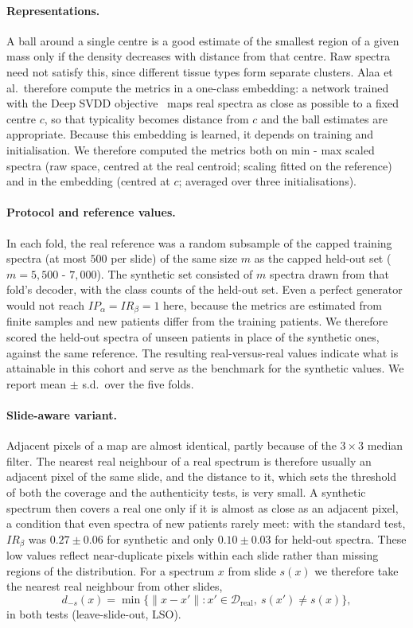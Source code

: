 \documentclass[12pt]{article}
\theoremstyle{paper}
\begin{document}
\paragraph{Representations.}
A ball around a single centre is a good estimate of the smallest region of a given mass only if
the density decreases with distance from that centre. Raw spectra need not satisfy this, since
different tissue types form separate clusters. Alaa et al.\ therefore compute the metrics in a
one-class embedding: a network trained with the Deep SVDD objective~\cite{ruff2018deep} maps real
spectra as close as possible to a fixed centre $c$, so that typicality becomes distance from $c$
and the ball estimates are appropriate. Because this embedding is learned, it depends on training
and initialisation. We therefore computed the metrics both on min - max scaled spectra (raw space,
centred at the real centroid; scaling fitted on the reference) and in the embedding (centred at
$c$; averaged over three initialisations).

\paragraph{Protocol and reference values.}
In each fold, the real reference was a random subsample of the capped training spectra (at most
$500$ per slide) of the same size $m$ as the capped held-out set ($m=5{,}500$ - $7{,}000$). The
synthetic set consisted of $m$ spectra drawn from that fold's decoder, with the class counts of the
held-out set. Even a perfect generator would not reach $IP_\alpha=IR_\beta=1$ here, because the
metrics are estimated from finite samples and new patients differ from the training patients. We
therefore scored the held-out spectra of unseen patients in place of the synthetic ones, against the
same reference. The resulting real-versus-real values indicate what is attainable in this cohort
and serve as the benchmark for the synthetic values. We report mean $\pm$ s.d.\ over the five folds.

\paragraph{Slide-aware variant.}
Adjacent pixels of a map are almost identical, partly because of the $3\times3$ median filter. The
nearest real neighbour of a real spectrum is therefore usually an adjacent pixel of the same slide,
and the distance to it, which sets the threshold of both the coverage and the authenticity tests,
is very small. A synthetic spectrum then covers a real one only if it is almost as close as an
adjacent pixel, a condition that even spectra of new patients rarely meet: with the standard test,
$IR_\beta$ was $0.27\pm0.06$ for synthetic and only $0.10\pm0.03$ for held-out spectra. These low
values reflect near-duplicate pixels within each slide rather than missing regions of the
distribution. For a spectrum $x$ from slide $s(x)$ we therefore take the nearest real neighbour from
other slides,
\begin{equation}
d_{-s}(x)=\min\bigl\{\lVert x-x'\rVert : x'\in\mathcal{D}_{\mathrm{real}},\ s(x')\neq s(x)\bigr\},
\end{equation}
in both tests (leave-slide-out, LSO).
\end{document}
